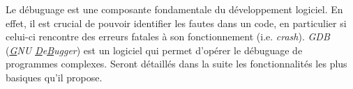 \documentclass[../../../main.tex]{subfiles}
\begin{document}
Le débuguage est une composante fondamentale du développement logiciel. En effet, il est crucial de pouvoir identifier les fautes dans un code, en particulier si celui-ci rencontre des erreurs fatales à son fonctionnement (i.e. \textit{crash}). \textit{GDB} (\textit{\underline{G}NU \underline{D}e\underline{B}ugger}) est un logiciel qui permet d'opérer le débuguage de programmes complexes. Seront détaillés dans la suite les fonctionnalités les plus basiques qu'il propose.
\end{document}

